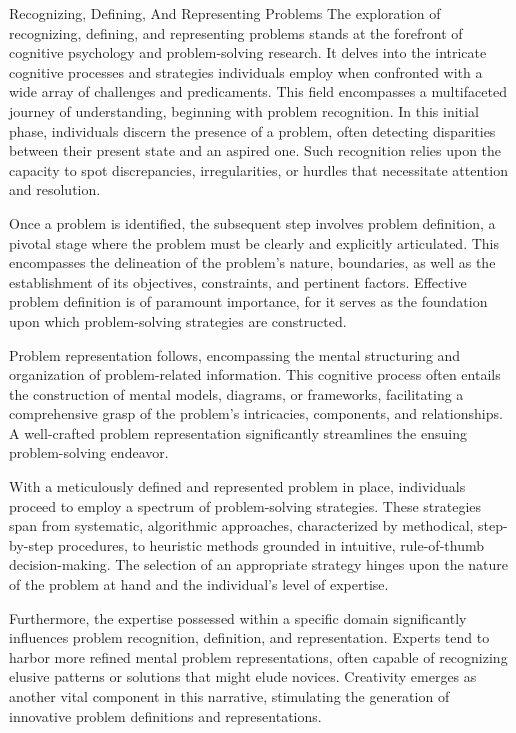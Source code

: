 \begin{notes}{Recognizing, Defining, And Representing Problems}
    The exploration of recognizing, defining, and representing problems stands at the forefront of cognitive psychology and problem-solving research. It delves into the intricate cognitive processes and 
    strategies individuals employ when confronted with a wide array of challenges and predicaments. This field encompasses a multifaceted journey of understanding, beginning with problem recognition. In 
    this initial phase, individuals discern the presence of a problem, often detecting disparities between their present state and an aspired one. Such recognition relies upon the capacity to spot 
    discrepancies, irregularities, or hurdles that necessitate attention and resolution.

    Once a problem is identified, the subsequent step involves problem definition, a pivotal stage where the problem must be clearly and explicitly articulated. This encompasses the delineation of the 
    problem's nature, boundaries, as well as the establishment of its objectives, constraints, and pertinent factors. Effective problem definition is of paramount importance, for it serves as the foundation 
    upon which problem-solving strategies are constructed.

    Problem representation follows, encompassing the mental structuring and organization of problem-related information. This cognitive process often entails the construction of mental models, diagrams, 
    or frameworks, facilitating a comprehensive grasp of the problem's intricacies, components, and relationships. A well-crafted problem representation significantly streamlines the ensuing problem-solving 
    endeavor.

    With a meticulously defined and represented problem in place, individuals proceed to employ a spectrum of problem-solving strategies. These strategies span from systematic, algorithmic approaches, 
    characterized by methodical, step-by-step procedures, to heuristic methods grounded in intuitive, rule-of-thumb decision-making. The selection of an appropriate strategy hinges upon the nature of the 
    problem at hand and the individual's level of expertise.

    Furthermore, the expertise possessed within a specific domain significantly influences problem recognition, definition, and representation. Experts tend to harbor more refined mental problem 
    representations, often capable of recognizing elusive patterns or solutions that might elude novices. Creativity emerges as another vital component in this narrative, stimulating the generation of 
    innovative problem definitions and representations.


\end{notes}
